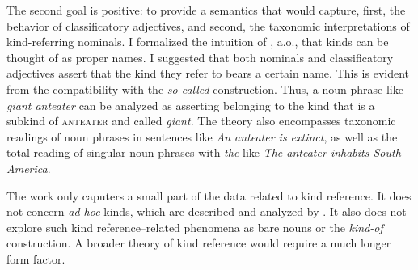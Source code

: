 \documentclass[a4paper, 12pt]{article}
\begin{document}
The second goal is positive: to provide a semantics that would capture, first, the behavior of classificatory adjectives, and second, the taxonomic interpretations of kind-referring nominals. I formalized the intuition of \textcite{carlson1977referencekindsenglish}, a.o., that kinds can be thought of as proper names. I suggested that both nominals and classificatory adjectives assert that the kind they refer to bears a certain name. This is evident from the compatibility with the \textit{so-called} construction. Thus, a noun phrase like \textit{giant anteater} can be analyzed as asserting belonging to the kind that is a subkind of \textsc{anteater} and called \textit{giant}. The theory also encompasses taxonomic readings of noun phrases in sentences like \textit{An anteater is extinct}, as well as the total reading of singular noun phrases with \textit{the} like \textit{The anteater inhabits South America}.

The work only caputers a small part of the data related to kind reference. It does not concern \textit{ad-hoc} kinds, which are described and analyzed by \textcite{mendia2019referenceadhoc}. It also does not explore such kind reference--related phenomena as bare nouns or the \textit{kind-of} construction. A broader theory of kind reference would require a much longer form factor.

\pagebreak
\printbibliography
\end{document}
